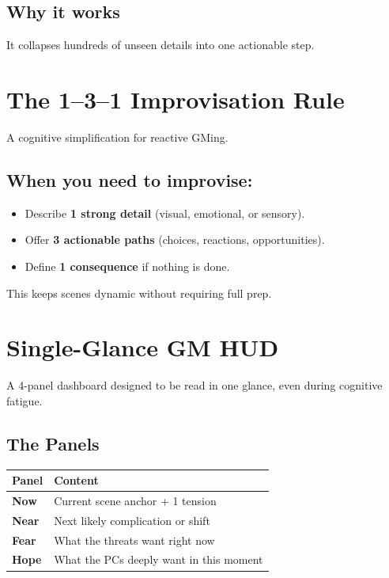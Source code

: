 \documentclass[11pt]{article}
\begin{document}
\subsection{Why it works}
It collapses hundreds of unseen details into one actionable step.


\section{The 1--3--1 Improvisation Rule}
\label{appendix:131}

A cognitive simplification for reactive GMing.

\subsection{When you need to improvise:}

\begin{itemize}
    \item Describe \textbf{1 strong detail} (visual, emotional, or sensory).
    \item Offer \textbf{3 actionable paths} (choices, reactions, opportunities).
    \item Define \textbf{1 consequence} if nothing is done.
\end{itemize}

This keeps scenes dynamic without requiring full prep.


\section{Single-Glance GM HUD}
\label{appendix:gm-hud}

A 4-panel dashboard designed to be read in one glance, even during cognitive fatigue.

\subsection{The Panels}

\begin{center}
\begin{longtable}{|p{3.5cm}|p{10cm}|}
\hline
\textbf{Panel} & \textbf{Content} \\
\hline
\textbf{Now} & Current scene anchor + 1 tension \\
\textbf{Near} & Next likely complication or shift \\
\textbf{Fear} & What the threats want right now \\
\textbf{Hope} & What the PCs deeply want in this moment \\
\hline
\end{longtable}
\end{center}
\end{document}
